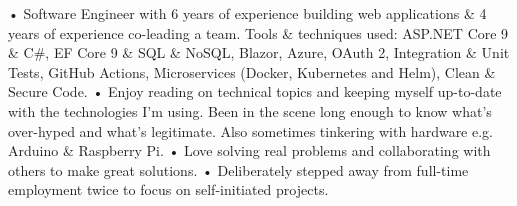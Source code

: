 

\begin{cvparagraph}

• Software Engineer with 6 years of experience building web applications \& 4 years of experience co-leading a team. Tools \& techniques used: ASP.NET Core 9 \& C\#, EF Core 9 \& SQL \& NoSQL, Blazor, Azure, OAuth 2, Integration \& Unit Tests, GitHub Actions, Microservices (Docker, Kubernetes and Helm), Clean \& Secure Code.
\newline
• Enjoy reading on technical topics and keeping myself up-to-date with the technologies I'm using. Been in the scene long enough to know what's over-hyped and what's legitimate. Also sometimes tinkering with hardware e.g. Arduino \& Raspberry Pi.
\newline
• Love solving real problems and collaborating with others to make great solutions.
\newline
• Deliberately stepped away from full-time employment twice to focus on self-initiated projects.
\end{cvparagraph}
